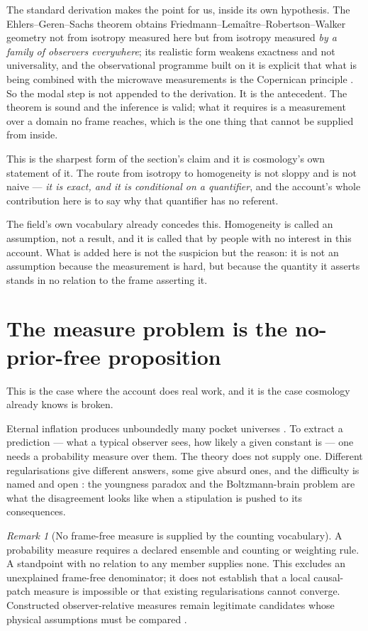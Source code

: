\documentclass[11pt,a4paper]{article}
\theoremstyle{remark}\newtheorem{remark}[definition]{Remark}
\begin{document}
The standard derivation makes the point for us, inside its own hypothesis. The
Ehlers--Geren--Sachs theorem \citep{ehlers1968} obtains Friedmann--Lema\^{i}tre--Robertson--Walker
geometry not from isotropy measured here but from isotropy measured \emph{by a family of observers
everywhere}; its realistic form \citep{stoeger1995} weakens exactness and not universality, and the
observational programme built on it is explicit that what is being combined with the microwave
measurements is the Copernican principle \citep{clarkson2012,maartens2011}. So the modal step is
not appended to the derivation. It is the antecedent. The theorem is sound and the inference is valid;
what it requires is a measurement over a domain no frame reaches, which is the one thing that cannot be
supplied from inside.

This is the sharpest form of the section's claim and it is cosmology's own statement of it. The
route from isotropy to homogeneity is not sloppy and is not naive --- \emph{it is exact, and it is
conditional on a quantifier}, and the account's whole contribution here is to say why that quantifier
has no referent.

The field's own vocabulary already concedes this. Homogeneity is called an assumption, not a
result, and it is called that by people with no interest in this account. What is added here is
not the suspicion but the reason: it is not an assumption because the measurement is hard, but because
the quantity it asserts stands in no relation to the frame asserting it.

\section{The measure problem is the no-prior-free proposition}\label{sec:measure}
This is the case where the account does real work, and it is the case cosmology already knows is
broken.

Eternal inflation produces unboundedly many pocket universes \citep{guth2007}. To extract a prediction
--- what a typical observer sees, how likely a given constant is --- one needs a probability measure over
them. The theory does not supply one. Different regularisations give different answers, some give
absurd ones, and the difficulty is named and open \citep{freivogel2011}: the youngness paradox and the
Boltzmann-brain problem \citep{bousso2007} are what the disagreement looks like when a stipulation is
pushed to its consequences.

\begin{remark}[No frame-free measure is supplied by the counting vocabulary]\label{prop:measure}
A probability measure requires a declared ensemble and counting or weighting
rule. A standpoint with no relation to any member supplies none. This excludes
an unexplained frame-free denominator; it does not establish that a local
causal-patch measure is impossible or that existing regularisations cannot
converge. Constructed observer-relative measures remain legitimate candidates
whose physical assumptions must be compared \citep{bousso2007,freivogel2011}.
\end{remark}
\end{document}
